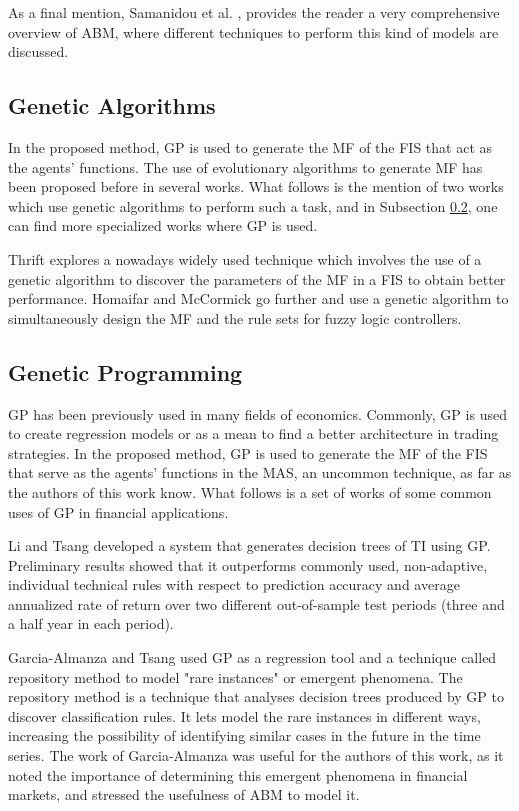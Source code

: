 \documentclass[a4paper,twoside]{article}
\begin{document}
As a final mention, Samanidou et al. \cite{Samanidou_2007}, provides the reader a very comprehensive overview of ABM, where different techniques to perform this kind of models are discussed.

\subsection{Genetic Algorithms}
\label{genetic-algorithms}

In the proposed method, GP is used to generate the MF of the FIS that act as the agents' functions. The use of evolutionary algorithms to generate MF has been proposed before in several works. What follows is the mention of two works which use genetic algorithms to perform such a task, and in Subsection \ref{genetic-programming}, one can find more specialized works where GP is used.

Thrift \cite{Thrift1991} explores a nowadays widely used technique which involves the use of a genetic algorithm to discover the parameters of the MF in a FIS to obtain better performance. Homaifar and McCormick \cite{Homaifar1995} go further and use a genetic algorithm to simultaneously design the MF and the rule sets for fuzzy logic controllers.

\subsection{Genetic Programming}
\label{genetic-programming}

GP has been previously used in many fields of economics. Commonly, GP is used to create regression models or as a mean to find a better architecture in trading strategies. In the proposed method, GP is used to generate the MF of the FIS that serve as the agents' functions in the MAS, an uncommon technique, as far as the authors of this work know. What follows is a set of works of some common uses of GP in financial applications.

Li and Tsang \cite{Li1999} developed a system that generates decision trees of TI using GP. Preliminary results showed that it outperforms commonly used, non-adaptive, individual technical rules with respect to prediction accuracy and average annualized rate of return over two different out-of-sample test periods (three and a half year in each period).

Garcia-Almanza and Tsang \cite{Garcia-Almanza2006} used GP as a regression tool and a technique called repository method to model "rare instances" or emergent phenomena. The repository method is a technique that analyses decision trees produced by GP to discover classification rules. It lets model the rare instances in different ways, increasing the possibility of identifying similar cases in the future in the time series. The work of Garcia-Almanza was useful for the authors of this work, as it noted the importance of determining this emergent phenomena in financial markets, and stressed the usefulness of ABM to model it.
\end{document}

